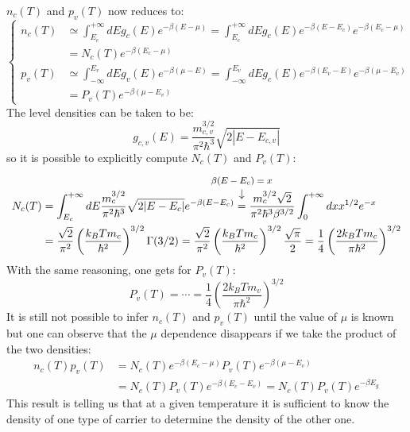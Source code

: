 \documentclass[10.75pt,a4paper,openright,bottom=2cm]{article}
\begin{document}
$n_c(T)$ and $p_v(T)$ now reduces to:
\begin{equation}
\label{ncpv}
\left\{
\begin{aligned}
n_c(T)&\simeq\int_{E_c}^{+\infty} dEg_c(E)e^{-\beta(E-\mu)}=\int_{E_c}^{+\infty} dEg_c(E)e^{-\beta(E-E_c)}e^{-\beta(E_c-\mu)}\\
&=N_c(T)e^{-\beta(E_c-\mu)}\\
p_v(T)&\simeq\int_{-\infty}^{E_v} dEg_v(E)e^{-\beta(\mu-E)}=\int_{-\infty}^{E_v} dEg_c(E)e^{-\beta(E_v-E)}e^{-\beta(\mu-E_v)}\\
&=P_v(T)e^{-\beta(\mu-E_v)}
\end{aligned}
\right.
\end{equation}
The level densities can be taken to be:
\[
g_{c,v}(E)=\frac{m_{c,v}^{3/2}}{\pi^2\hbar^3}\sqrt{2|E-E_{c,v}|}
\]
so it is possible to explicitly compute $N_c(T)$ and $P_v(T)$:
\begin{align*}
N_c(T)&=\int_{E_c}^{+\infty} dE\frac{m_c^{3/2}}{\pi^2\hbar^3}\sqrt{2|E-E_c|}e^{-\beta(E-E_c)}\overset{\mathclap{\tikz \node {$\downarrow$} node [above=1ex] {\footnotesize $\beta(E-E_c)=x$ };}}
{=}\frac{m_c^{3/2}\sqrt{2}}{\pi^2\hbar^3\beta^{3/2}}\int_0^{+\infty}dxx^{1/2}e^{-x}\\
&=\frac{\sqrt{2}}{\pi^2}\left(\frac{k_BTm_c}{\hbar^2}\right)^{3/2}\Gamma(3/2)=\frac{\sqrt{2}}{\pi^2}\left(\frac{k_BTm_c}{\hbar^2}\right)^{3/2}\frac{\sqrt{\pi}}{2}=\frac{1}{4}\left(\frac{2k_BTm_c}{\pi\hbar^2}\right)^{3/2}
\end{align*}
With the same reasoning, one gets for $P_v(T)$:
\[
P_v(T)=\cdots=\frac{1}{4}\left(\frac{2k_BTm_v}{\pi\hbar^2}\right)^{3/2}
\]
It is still not possible to infer $n_c(T)$ and $p_v(T)$ until the value of $\mu$ is known but one can observe that the $\mu$ dependence disappears if we take the product of the two densities:
\begin{align*}
n_c(T)p_v(T)&=N_c(T)e^{-\beta(E_c-\mu)}P_v(T)e^{-\beta(\mu-E_v)}\\
&=N_c(T)P_v(T)e^{-\beta(E_c-E_v)}=N_c(T)P_v(T)e^{-\beta E_g}
\end{align*}
This result is telling us that at a given temperature it is sufficient to know the density of one type of carrier to determine the density of the other one.
\end{document}
